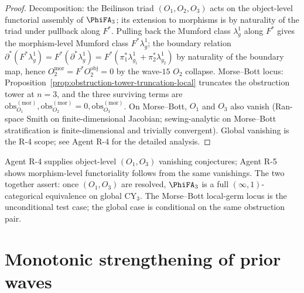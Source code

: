 \begin{proof}
Decomposition: the Beilinson triad $(O_1, O_2, O_3)$ acts on the
object-level functorial assembly of
$\PhiFA_3$; its extension to morphisms is by naturality of the triad
under pullback along $F^*$.  Pulling back the Mumford class
$\lambda_g^1$ along $F^*$ gives the morphism-level Mumford class
$F^* \lambda_g^1$; the boundary relation $\partial^* (F^* \lambda_g^1)
= F^* (\partial^* \lambda_g^1) = F^*(\pi_1^* \lambda_{g_1}^1 + \pi_2^*
\lambda_{g_2}^1)$ by naturality of the boundary map, hence $O_2^{\mathrm{mor}}
= F^* O_2^{\mathrm{obj}} = 0$ by the wave-$15$ $O_2$ collapse.
Morse--Bott locus: Proposition~\ref{prop:obstruction-tower-truncation-local}
truncates the obstruction tower at $n = 3$, and the three surviving
terms are $\mathrm{obs}^{(\text{mor})}_{O_1}, \mathrm{obs}^{(\text{mor})}_{O_2}
= 0, \mathrm{obs}^{(\text{mor})}_{O_3}$.  On Morse--Bott, $O_1$ and
$O_3$ also vanish (Ran-space Smith on finite-dimensional Jacobian;
sewing-analytic on Morse--Bott stratification is finite-dimensional
and trivially convergent).  Global vanishing is the R-4 scope; see
Agent R-4 for the detailed analysis.
\end{proof}

\begin{remark}
\label{rem:R4-R5-dual-aspects}
Agent R-4 supplies object-level $(O_1, O_3)$ vanishing conjectures;
Agent R-5 shows morphism-level functoriality follows from the same
vanishings.  The two together assert: once $(O_1, O_3)$ are resolved,
$\PhiFA_3$ is a full $(\infty,1)$-categorical equivalence on global
CY$_3$.  The Morse--Bott local-germ locus is the unconditional test
case; the global case is conditional on the same obstruction pair.
\end{remark}

\section*{Monotonic strengthening of prior waves}


